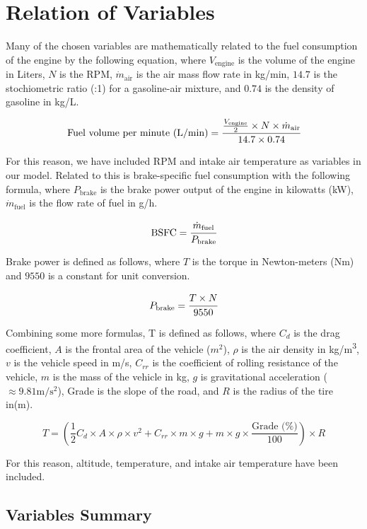 \documentclass[letterpaper]{article}
\begin{document}
\section*{Relation of Variables}

Many of the chosen variables are mathematically related to the fuel 
consumption of the engine by the following equation, where 
$V_{\mathrm{engine}}$ is the volume of the engine in Liters, $N$ is the 
RPM, $\dot{m}_{\mathrm{air}}$ is the air mass flow rate in kg/min, $14.7$ 
is the stochiometric ratio (:1) for a gasoline-air mixture, and $0.74$ is 
the density of gasoline in kg/L.

\[
\text{Fuel volume per minute (L/min)} = \cfrac{\frac{V_{\mathrm{engine}}}{2} \times N \times \dot{m}_{\mathrm{air}}}{14.7\times 0.74}
\]

For this reason, we have included RPM and intake air temperature as 
variables in our model. Related to this is brake-specific fuel consumption 
with the following formula, where $P_{\mathrm{brake}}$ is the brake power 
output of the engine in kilowatts (kW), $\dot{m}_{\mathrm{fuel}}$ is the 
flow rate of fuel in g/h.

\[
\mathrm{BSFC} = \cfrac{\dot{m}_{\mathrm{fuel}}}{P_{\mathrm{brake}}}
\]

Brake power is defined as follows, where $T$ is the torque in Newton-meters 
(Nm) and $9550$ is a constant for unit conversion.

\[
P_{\mathrm{brake}} = \cfrac{T \times N}{9550}
\]

Combining some more formulas, T is defined as follows, where $C_d$ is the 
drag coefficient, $A$ is the frontal area of the vehicle ($m^2$), $\rho$ 
is the air density in kg/m\textsuperscript{3}, $v$ is the vehicle speed 
in m/s, $C_{rr}$ is the coefficient of rolling resistance of the vehicle, 
$m$ is the mass of the vehicle in kg, $g$ is gravitational acceleration 
($\approx 9.81 \mathrm{m}/\mathrm{s}^2$), Grade is the slope of the road, 
and $R$ is the radius of the tire in(m).

\[
T = (\frac{1}{2}C_d\times A \times \rho \times v^2 + C_{rr} \times m \times g + m \times g \times \frac{\text{Grade (\%)}}{100})\times R
\]

For this reason, altitude, temperature, and intake air temperature have 
been included. 

\subsection*{Variables Summary}
\end{document}
